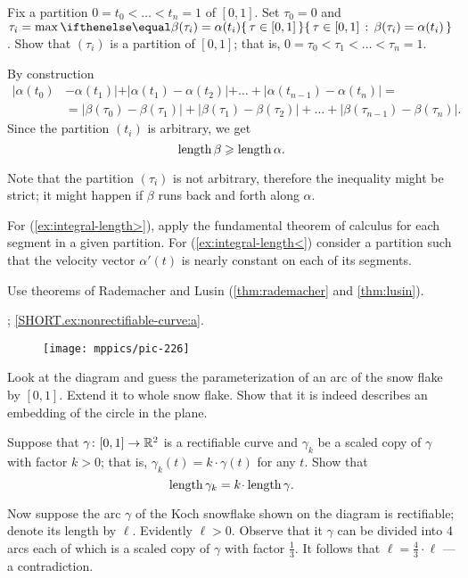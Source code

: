 Fix a partition $0=t_0<\dots <t_n=1$ of $[0,1]$.
Set $\tau_0=0$ and $\tau_i=\max\set{\tau \in[0,1]}{\beta(\tau_i)=\alpha(t_i)}$.
Show that $(\tau_i)$ is a partition of $[0,1]$;
that is, $0=\tau_0<\tau_1<\dots<\tau_n=1$.

By construction 
\begin{align*}
|\alpha(t_0)&-\alpha(t_1)|+|\alpha(t_1)-\alpha(t_2)|+\dots+|\alpha(t_{n-1})-\alpha(t_n)|=
\\
&=
|\beta(\tau_0)-\beta(\tau_1)|+|\beta(\tau_1)-\beta(\tau_2)|+\dots+|\beta(\tau_{n-1})-\beta(\tau_n)|.
\end{align*}
Since the partition $(t_i)$ is arbitrary, we get 
\[\mathop{\rm length}\nolimits \beta\geqslant \mathop{\rm length}\nolimits \alpha.\]

Note that the partition $(\tau_i)$ is not arbitrary, therefore the inequality might be strict; it might happen if $\beta$ runs back and forth along $\alpha$.




 For (\ref{ex:integral-length>}), apply the fundamental theorem of calculus for each segment in a given partition. For (\ref{ex:integral-length<}) consider a partition such that the velocity vector $\alpha'(t)$ is nearly constant on each of its segments.

 Use theorems of Rademacher and Lusin (\ref{thm:rademacher} and \ref{thm:lusin}).

\parbf{\ref{ex:nonrectifiable-curve}}; \ref{SHORT.ex:nonrectifiable-curve:a}.
\begin{figure}[h!]
\vskip-0mm
\centering
\texttt{[image: mppics/pic-226]}
\vskip0mm
\end{figure}
Look at the diagram and guess the parameterization of an arc of the snow flake by $[0,1]$.
Extend it to whole snow flake.
Show that it is indeed describes an embedding of the circle in the plane.

Suppose that $\gamma\colon[0,1]\to\mathbb{R}^2$ is a rectifiable curve and $\gamma_k$ be a scaled copy of $\gamma$ with factor $k>0$;
that is, $\gamma_k(t)=k\cdot\gamma(t)$ for any $t$.
Show that 
\[\length\gamma_k=k\cdot\length \gamma.\]

Now suppose the arc $\gamma$ of the Koch snowflake shown on the diagram is rectifiable; denote its length by $\ell$.
Evidently $\ell>0$.
Observe that it $\gamma$ can be divided into 4 arcs each of which is a scaled copy of $\gamma$ with factor $\tfrac13$.
It follows that $\ell=\tfrac43\cdot\ell$ --- a contradiction.


